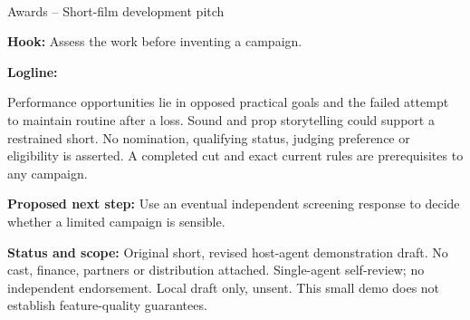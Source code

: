 \documentclass[11pt,letterpaper]{article}
\begin{document}
\begin{center}
{\Large\bfseries\sffamily \filmtitleupper}\\[6pt]
Awards -- Short-film development pitch
\end{center}
\textbf{Hook:} Assess the work before inventing a campaign.

\textbf{Logline:} \filmlogline

Performance opportunities lie in opposed practical goals and the failed attempt to maintain routine after a loss. Sound and prop storytelling could support a restrained short. No nomination, qualifying status, judging preference or eligibility is asserted. A completed cut and exact current rules are prerequisites to any campaign.

\textbf{Proposed next step:} Use an eventual independent screening response to decide whether a limited campaign is sensible.

\textbf{Status and scope:} Original short, revised host-agent demonstration draft. No cast, finance, partners or distribution attached. Single-agent self-review; no independent endorsement. Local draft only, unsent. This small demo does not establish feature-quality guarantees.
\end{document}
